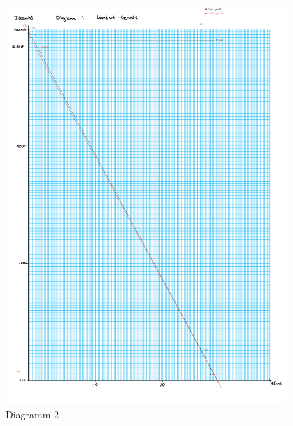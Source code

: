\begin{figure}[h!]
    \centering
    \includegraphics[page=2, width=0.95\textwidth,]{Versuch34Dias.pdf}
    \caption{Diagramm 2}
\end{figure}
\newpage
